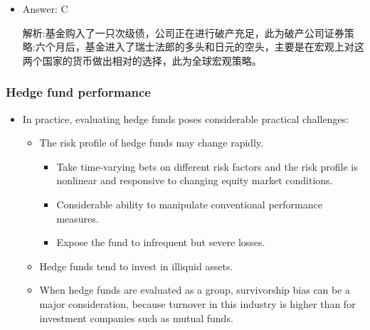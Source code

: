 \begin{itemize}
\begin{itemize}
    Six months later, the fund completed a second transaction involving a long position in Swiss Francs and a short position in Japanese Yen based on forecasted movements in interest rates in the two countries. What two hedge fund strategies are most likely being employed by Moore's hedge fund?

A. Distressed securities strategy and equity long/short strategy.

B. Fixed-income arbitrage and global macro strategy.

C. Distressed securities strategy and global macro strategy.

D. Fixed-income arbitrage and equity long/short strategy.

\item Answer: C

解析:基金购入了一只次级债，公司正在进行破产充足，此为破产公司证券策略:六个月后，基金进入了瑞士法郎的多头和日元的空头，主要是在宏观上对这两个国家的货币做出相对的选择，此为全球宏观策略。


    \end{itemize}
\end{itemize}



\subsubsection{Hedge fund performance}
\begin{itemize}
\item In practice, evaluating hedge funds poses considerable practical challenges:
    \begin{itemize}
    \item The risk profile of hedge funds may change rapidly.
        \begin{itemize}
        \item Take time-varying bets on different risk factors and the risk profile is nonlinear and responsive to changing equity market conditions.
        \item Considerable ability to manipulate conventional performance measures.
        \item Expose the fund to infrequent but severe losses.
        \end{itemize}
    \item Hedge funds tend to invest in illiquid assets.
    \item When hedge funds are evaluated as a group, survivorship bias can be a major consideration, because turnover in this industry is higher than for investment companies such as mutual funds.
    \end{itemize}
    

\end{itemize}



